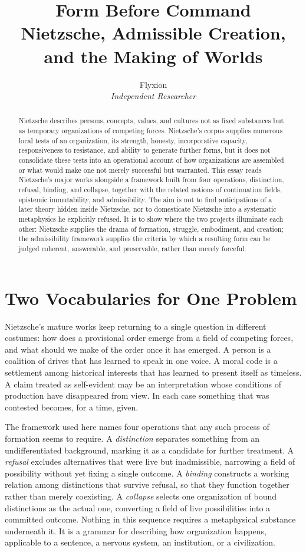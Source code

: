 \documentclass[11pt]{article}
\title{\textbf{Form Before Command}\\[4pt]\large Nietzsche, Admissible Creation, and the Making of Worlds}
\author{Flyxion \\ \textit{Independent Researcher}}
\date{}
\begin{document}
\maketitle

\begin{abstract}
Nietzsche describes persons, concepts, values, and cultures not as fixed substances but as temporary organizations of competing forces. Nietzsche's corpus supplies numerous local tests of an organization, its strength, honesty, incorporative capacity, responsiveness to resistance, and ability to generate further forms, but it does not consolidate these tests into an operational account of how organizations are assembled or what would make one not merely successful but warranted. This essay reads Nietzsche's major works alongside a framework built from four operations, distinction, refusal, binding, and collapse, together with the related notions of continuation fields, epistemic immutability, and admissibility. The aim is not to find anticipations of a later theory hidden inside Nietzsche, nor to domesticate Nietzsche into a systematic metaphysics he explicitly refused. It is to show where the two projects illuminate each other: Nietzsche supplies the drama of formation, struggle, embodiment, and creation; the admissibility framework supplies the criteria by which a resulting form can be judged coherent, answerable, and preservable, rather than merely forceful.
\end{abstract}

\section*{Two Vocabularies for One Problem}

Nietzsche's mature works keep returning to a single question in different costumes: how does a provisional order emerge from a field of competing forces, and what should we make of the order once it has emerged. A person is a coalition of drives that has learned to speak in one voice. A moral code is a settlement among historical interests that has learned to present itself as timeless. A claim treated as self-evident may be an interpretation whose conditions of production have disappeared from view. In each case something that was contested becomes, for a time, given.

The framework used here names four operations that any such process of formation seems to require. A \emph{distinction} separates something from an undifferentiated background, marking it as a candidate for further treatment. A \emph{refusal} excludes alternatives that were live but inadmissible, narrowing a field of possibility without yet fixing a single outcome. A \emph{binding} constructs a working relation among distinctions that survive refusal, so that they function together rather than merely coexisting. A \emph{collapse} selects one organization of bound distinctions as the actual one, converting a field of live possibilities into a committed outcome. Nothing in this sequence requires a metaphysical substance underneath it. It is a grammar for describing how organization happens, applicable to a sentence, a nervous system, an institution, or a civilization.
\end{document}
